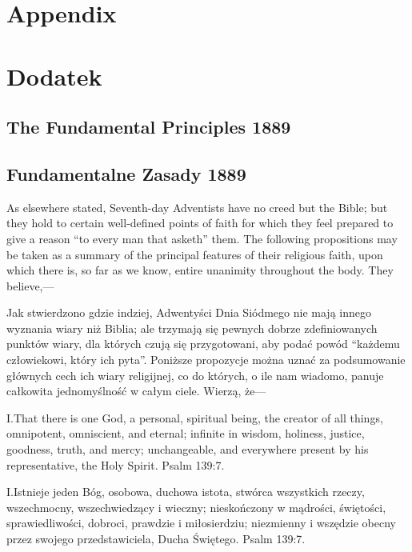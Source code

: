 \chapter*{Appendix} \label{chap:appendix}


\chapter*{Dodatek} \label{chap:appendix}


\section*{The Fundamental Principles 1889}


\section*{Fundamentalne Zasady 1889}


As elsewhere stated, Seventh-day Adventists have no creed but the Bible; but they hold to certain well-defined points of faith for which they feel prepared to give a reason “to every man that asketh” them. The following propositions may be taken as a summary of the principal features of their religious faith, upon which there is, so far as we know, entire unanimity throughout the body. They believe,—


Jak stwierdzono gdzie indziej, Adwentyści Dnia Siódmego nie mają innego wyznania wiary niż Biblia; ale trzymają się pewnych dobrze zdefiniowanych punktów wiary, dla których czują się przygotowani, aby podać powód “każdemu człowiekowi, który ich pyta”. Poniższe propozycje można uznać za podsumowanie głównych cech ich wiary religijnej, co do których, o ile nam wiadomo, panuje całkowita jednomyślność w całym ciele. Wierzą, że—


\lettrine{I.} That there is one God, a personal, spiritual being, the creator of all things, omnipotent, omniscient, and eternal; infinite in wisdom, holiness, justice, goodness, truth, and mercy; unchangeable, and everywhere present by his representative, the Holy Spirit. Psalm 139:7.


\lettrine{I.} Istnieje jeden Bóg, osobowa, duchowa istota, stwórca wszystkich rzeczy, wszechmocny, wszechwiedzący i wieczny; nieskończony w mądrości, świętości, sprawiedliwości, dobroci, prawdzie i miłosierdziu; niezmienny i wszędzie obecny przez swojego przedstawiciela, Ducha Świętego. Psalm 139:7.


